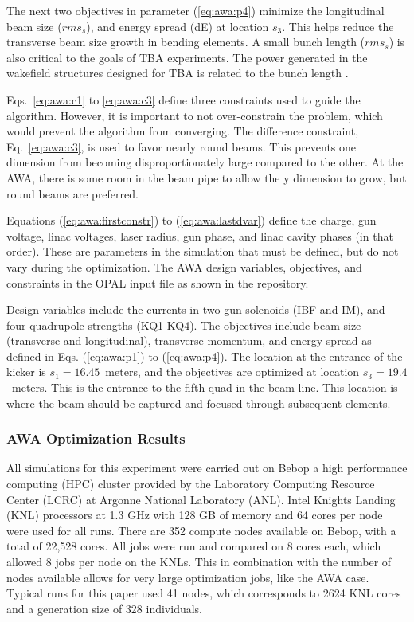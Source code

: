 The next two objectives in parameter (\ref{eq:awa:p4}) minimize the 
longitudinal beam size ($rms_s$), and energy spread (dE) at location $s_3$. 
This helps reduce the transverse beam size growth in bending elements.
A small bunch length ($rms_s$) is also critical to the goals of 
TBA experiments. The power generated in the wakefield structures 
designed for TBA is related to the bunch length \cite{JING201872,PETSeq}.

Eqs.~\ref{eq:awa:c1} to \ref{eq:awa:c3} 
define three constraints used to guide the algorithm.
However, it is important to not over-constrain the problem, which would prevent
the algorithm from converging.
The difference constraint, Eq.~\ref{eq:awa:c3}, is used to favor nearly round beams.
This prevents one dimension from becoming disproportionately large compared to the other.
At the AWA, there is some room in the beam pipe to allow the y dimension to grow, but round beams are preferred.

Equations (\ref{eq:awa:firstconstr}) to
(\ref{eq:awa:lastdvar}) define the charge, gun voltage, linac voltages, 
laser radius, gun phase, and linac cavity phases (in that order). 
These are parameters in the simulation 
that must be defined, but do not vary during the optimization.
The AWA design variables, objectives, and constraints in the OPAL input file as shown in
the repository.


Design variables include the currents in two gun solenoids (IBF and IM), 
and four quadrupole strengths (KQ1-KQ4). The objectives include
beam size (transverse and longitudinal), transverse momentum, and energy spread as
defined in Eqs. (\ref{eq:awa:p1}) to (\ref{eq:awa:p4}). 
The location at the entrance of the kicker is $s_1=16.45$~meters, 
and the objectives are optimized at location $s_3=19.4$~meters. 
This is the entrance to the fifth quad in the beam line. 
This location is where the beam should be captured and focused through subsequent elements.


\subsubsection{AWA Optimization Results}
All simulations for this experiment were carried out on Bebop a
high performance computing (HPC)
cluster provided by the Laboratory Computing Resource Center (LCRC)
at Argonne National Laboratory (ANL). Intel Knights Landing 
(KNL) processors at 1.3 GHz with 128 GB of memory 
and 64 cores per node were used for all runs. 
There are 352 compute nodes available on 
Bebop, with a total of 22,528 cores. All jobs were run and compared 
on 8 cores each, which allowed 8 jobs per node on the KNLs.
This in combination with the number of nodes available 
allows for very large optimization jobs, like the AWA case.
Typical runs for this paper used 41 nodes, which corresponds to 2624 KNL cores 
and a generation size of 328 individuals.



